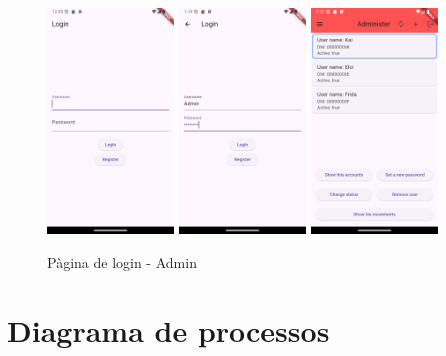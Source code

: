 \documentclass[a4paper,12pt,twoside]{ThesisStyle}
\begin{document}
\begin{figure}[h]
    \centering
    \includegraphics[width=0.3\textwidth]{imatges/login.png}
    \includegraphics[width=0.3\textwidth]{imatges/loginAdmin.png}
    \includegraphics[width=0.3\textwidth]{imatges/administer.png}
    \caption{ Pàgina de login - Admin}
    \label{fig: Pàgina de login - Admin}
\end{figure}

\clearpage

\section{ Diagrama de processos }
\label{ sec: Diagrama de processos }
\end{document}
